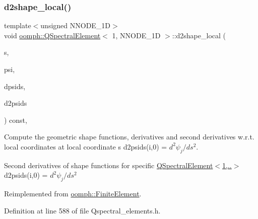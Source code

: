 \subsubsection{\texorpdfstring{d2shape\+\_\+local()}{d2shape\_local()}}
{\footnotesize\ttfamily template$<$unsigned N\+N\+O\+D\+E\+\_\+1D$>$ \\
void \hyperlink{classoomph_1_1QSpectralElement}{oomph\+::\+Q\+Spectral\+Element}$<$ 1, N\+N\+O\+D\+E\+\_\+1D $>$\+::d2shape\+\_\+local (\begin{DoxyParamCaption}\item[{const \hyperlink{classoomph_1_1Vector}{Vector}$<$ double $>$ \&}]{s,  }\item[{\hyperlink{classoomph_1_1Shape}{Shape} \&}]{psi,  }\item[{\hyperlink{classoomph_1_1DShape}{D\+Shape} \&}]{dpsids,  }\item[{\hyperlink{classoomph_1_1DShape}{D\+Shape} \&}]{d2psids }\end{DoxyParamCaption}) const\hspace{0.3cm}{\ttfamily [inline]}, {\ttfamily [virtual]}}



Compute the geometric shape functions, derivatives and second derivatives w.\+r.\+t. local coordinates at local coordinate s d2psids(i,0) = $ d^2 \psi_j / d s^2 $. 

Second derivatives of shape functions for specific \hyperlink{classoomph_1_1QSpectralElement_3_011_00_01NNODE__1D_01_4_a747bf14338887c74303f56febdfba957}{Q\+Spectral\+Element$<$1,..$>$} d2psids(i,0) = $ d^2 \psi_j / d s^2 $ 

Reimplemented from \hyperlink{classoomph_1_1FiniteElement_a53e5051582d9da07b9d35da9debd0cd7}{oomph\+::\+Finite\+Element}.



Definition at line 588 of file Qspectral\+\_\+elements.\+h.

\mbox{\label{classoomph_1_1QSpectralElement_3_011_00_01NNODE__1D_01_4_a9118f192015bc057bf90eb0f741d5c27}} 
